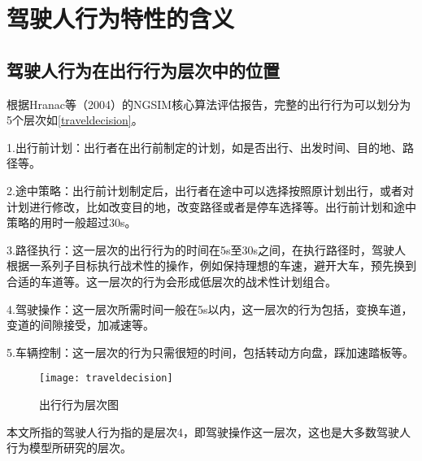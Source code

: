 \chapter{驾驶人行为特性的含义}
\section{驾驶人行为在出行行为层次中的位置}
根据Hranac等（2004）的NGSIM核心算法评估报告\cite{Hranac2004}，完整的出行行为可以划分为5个层次如\autoref{traveldecision}。

1.出行前计划：出行者在出行前制定的计划，如是否出行、出发时间、目的地、路径等。

2.途中策略：出行前计划制定后，出行者在途中可以选择按照原计划出行，或者对计划进行修改，比如改变目的地，改变路径或者是停车选择等。出行前计划和途中策略的用时一般超过30s。

3.路径执行：这一层次的出行行为的时间在5s至30s之间，在执行路径时，驾驶人根据一系列子目标执行战术性的操作，例如保持理想的车速，避开大车，预先换到合适的车道等。这一层次的行为会形成低层次的战术性计划组合。

4.驾驶操作：这一层次所需时间一般在5s以内，这一层次的行为包括，变换车道，变道的间隙接受，加减速等。

5.车辆控制：这一层次的行为只需很短的时间，包括转动方向盘，踩加速踏板等。

\begin{figure}[htpb]
	\centering
	\texttt{[image: traveldecision]}
	\caption{出行行为层次图\cite{Hranac2004}}
	\label{traveldecision}
\end{figure}

本文所指的驾驶人行为指的是层次4，即驾驶操作这一层次，这也是大多数驾驶人行为模型所研究的层次。


